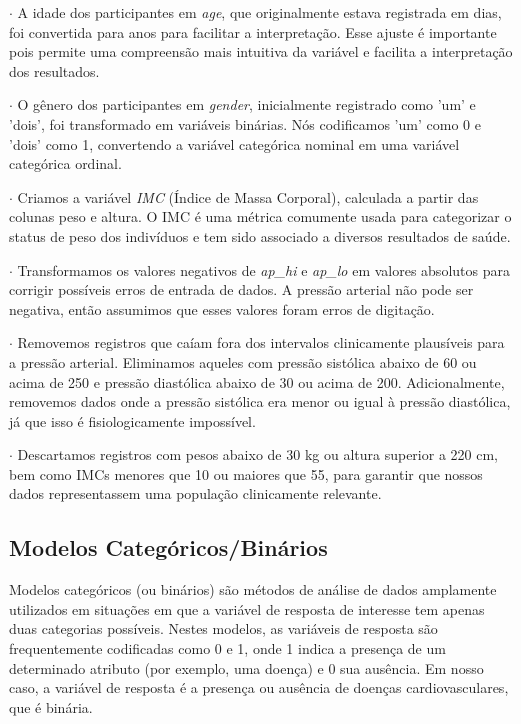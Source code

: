 \documentclass[article,11pt,a4paper,brazil]{abntex2}
\begin{document}
	\noindent $\boldsymbol{\cdot}$ A idade dos participantes em \textit{age}, que originalmente estava registrada em dias, foi convertida para anos para facilitar a interpretação. Esse ajuste é importante pois permite uma compreensão mais intuitiva da variável e facilita a interpretação dos resultados.
	
	\noindent $\boldsymbol{\cdot}$ O gênero dos participantes em \textit{gender}, inicialmente registrado como 'um' e 'dois', foi transformado em variáveis binárias. Nós codificamos 'um' como 0 e 'dois' como 1, convertendo a variável categórica nominal em uma variável categórica ordinal. 
	
	\noindent $\boldsymbol{\cdot}$ Criamos a variável \textit{IMC} (Índice de Massa Corporal), calculada a partir das colunas peso e altura. O IMC é uma métrica comumente usada para categorizar o status de peso dos indivíduos e tem sido associado a diversos resultados de saúde.
	
	\noindent $\boldsymbol{\cdot}$ Transformamos os valores negativos de \textit{ap\_hi} e \textit{ap\_lo} em valores absolutos para corrigir possíveis erros de entrada de dados. A pressão arterial não pode ser negativa, então assumimos que esses valores foram erros de digitação. 
	
	\noindent $\boldsymbol{\cdot}$ Removemos registros que caíam fora dos intervalos clinicamente plausíveis para a pressão arterial. Eliminamos aqueles com pressão sistólica abaixo de 60 ou acima de 250 e pressão diastólica abaixo de 30 ou acima de 200. Adicionalmente, removemos dados onde a pressão sistólica era menor ou igual à pressão diastólica, já que isso é fisiologicamente impossível.
	
	\noindent $\boldsymbol{\cdot}$ Descartamos registros com pesos abaixo de 30 kg ou altura superior a 220 cm, bem como IMCs menores que 10 ou maiores que 55, para garantir que nossos dados representassem uma população clinicamente relevante.
	
	\subsection{Modelos Categóricos/Binários}
	
	Modelos categóricos (ou binários) são métodos de análise de dados amplamente utilizados em situações em que a variável de resposta de interesse tem apenas duas categorias possíveis. Nestes modelos, as variáveis de resposta são frequentemente codificadas como 0 e 1, onde 1 indica a presença de um determinado atributo (por exemplo, uma doença) e 0 sua ausência. Em nosso caso, a variável de resposta é a presença ou ausência de doenças cardiovasculares, que é binária.
	
\end{document}

